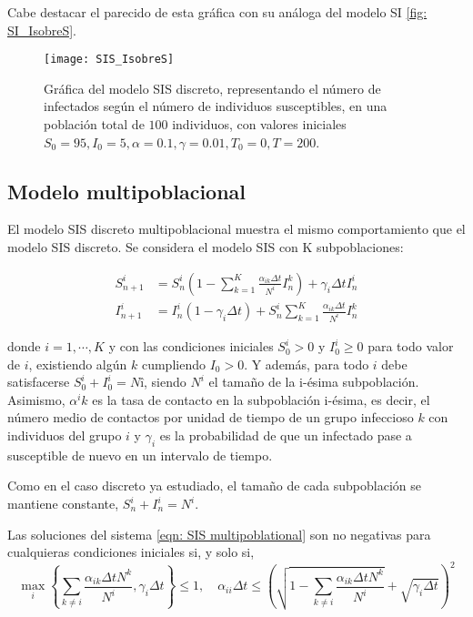Cabe destacar el parecido de esta gráfica con su análoga del modelo SI \eqref{fig: SI_IsobreS}.

\begin{figure}
\begin{center}
\caption{Gráfica del modelo SIS discreto, representando el número de infectados según el número de individuos susceptibles, en una población total de $100$ individuos, con valores iniciales $S_0=95, I_0 = 5, \alpha = 0.1, \gamma=0.01, T_0 = 0, T = 200$.}
\label{fig: SIS_IsobreS}
\texttt{[image: SIS\_IsobreS]}
\end{center}
\end{figure}

\subsection{Modelo multipoblacional}

El modelo SIS discreto multipoblacional muestra el mismo comportamiento que el modelo SIS discreto. Se considera el modelo SIS con K subpoblaciones:

\begin{equation}
\label{eqn: SIS multipoblational}
\begin{aligned}
S_{n+1}^i &= S_n^i \left( 1- \sum_{k=1}^{K} \frac{\alpha_{ik}\Delta t}{N^i}I_n^k \right) +\gamma_i \Delta t I_n^i\\
I_{n+1}^i &= I_n^i (1-\gamma_i\Delta t) + S_n^i\sum_{k=1}^{K}\frac{\alpha_{ik}\Delta t}{N^i}I_n^k 
\end {aligned}
\end{equation}

donde $i=1, \cdots , K$ y con las condiciones iniciales $S_0^i > 0$ y $I_0^i\geq 0$ para todo valor de $i$, existiendo algún $k$ cumpliendo $I_0>0$. Y además, para todo $i$ debe satisfacerse $S_0^i+I_0^i=Nî$, siendo $N^i$ el tamaño de la i-ésima subpoblación. Asimismo, $\alpha^ik$ es la tasa de contacto en la subpoblación i-ésima, es decir, el número medio de contactos por unidad de tiempo de un grupo infeccioso $k$ con individuos del grupo $i$ y $\gamma_i$ es la probabilidad de que un infectado pase a susceptible de nuevo en un intervalo de tiempo.

Como en el caso discreto ya estudiado, el tamaño de cada subpoblación se mantiene constante, $S_n^i+I_n^i=N^i$.

\begin{proposition}
Las soluciones del sistema \eqref{eqn: SIS multipoblational} son no negativas para cualquieras condiciones iniciales si, y solo si,
$$\max_i \left\{ \sum_{k\neq i}\frac{\alpha_{ik}\Delta tN^k}{N^i}, \gamma_i\Delta t \right\} \leq 1, \quad  \alpha_{ii}\Delta t\leq \left( \sqrt{1-\sum_{k\neq i}\frac{\alpha_{ik}\Delta tN^k}{N^i}} + \sqrt{\gamma_i\Delta t} \right)^2$$
\end{proposition}








